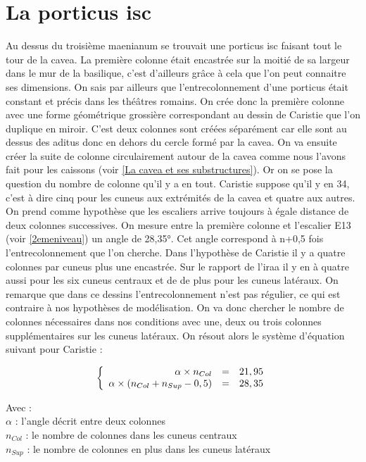 \section{La \gls{porticus isc}}
Au dessus du troisième maenianum se trouvait une \gls{porticus isc} faisant tout le tour de la cavea. La première colonne était encastrée sur la moitié de sa largeur dans le mur de la basilique, c'est d'ailleurs grâce à cela que l'on peut connaitre ses dimensions. On sais par ailleurs que l'entrecolonnement d'une porticus était constant et précis dans les théâtres romains. On crée donc la première colonne avec une forme géométrique grossière correspondant au dessin de Caristie que l'on duplique en miroir. C'est deux colonnes sont créées séparément car elle sont au dessus des aditus donc en dehors du cercle formé par la cavea. On va ensuite créer la suite de colonne circulairement autour de la cavea comme nous l'avons fait pour les caissons (voir \ref{La cavea et ses substructures}). Or on se pose la question du nombre de colonne qu'il y a en tout. Caristie suppose qu'il y en 34, c'est à dire cinq pour les \gls{cuneus} aux extrémités de la cavea et quatre aux autres. On prend comme hypothèse que les escaliers arrive toujours à égale distance de deux colonnes successives. On mesure entre la première colonne et l'escalier E13 (voir \ref{2emeniveau}) un angle de 28,35°. Cet angle correspond à n+0,5 fois l'entrecolonnement que l'on cherche. Dans l'hypothèse de Caristie il y a quatre colonnes par cuneus plus une encastrée. Sur le rapport de l'\gls{iraa} \cite[Pl. XX]{orangePl} il y en à quatre aussi pour les six cuneus centraux et de de plus pour les cuneus latéraux. On remarque que dans ce dessins l'entrecolonnement n'est pas régulier, ce qui est contraire à nos hypothèses de modélisation. On va donc chercher le nombre de colonnes nécessaires dans nos conditions avec une, deux ou trois colonnes supplémentaires sur les cuneus latéraux. On résout alors le système d'équation suivant pour Caristie :


\begin{equation}
  \left \{
   \begin{array}{r c l}
      \alpha \times n_{Col}  & = & 21,95 \\
      \alpha \times (n_{Col} + n_{Sup} - 0,5)   & = &  28,35
   \end{array}
   \right .
\end{equation}

Avec : \\
$\alpha$ : l'angle décrit entre deux colonnes \\
$n_{Col}$ : le nombre de colonnes dans les cuneus centraux \\
$n_{Sup}$ : le nombre de colonnes en plus dans les cuneus latéraux \\

